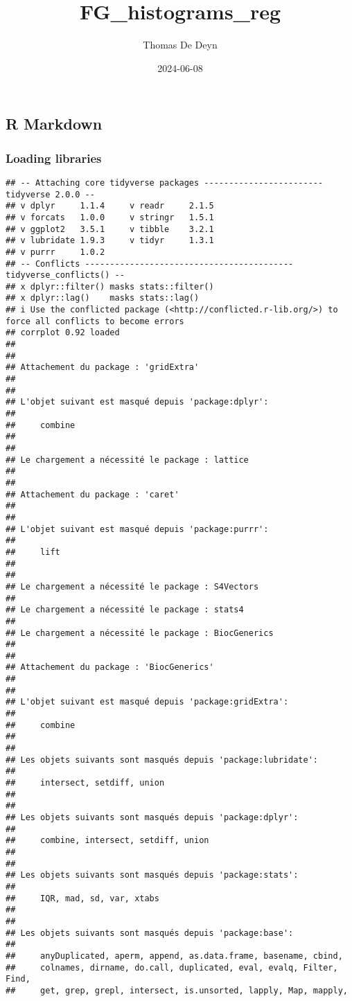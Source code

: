 \documentclass[
]{article}
\title{FG\_histograms\_reg}
\author{Thomas De Deyn}
\date{2024-06-08}
\begin{document}
\maketitle

\hypertarget{r-markdown}{%
\subsection{R Markdown}\label{r-markdown}}

\hypertarget{loading-libraries}{%
\subsubsection{Loading libraries}\label{loading-libraries}}

\begin{verbatim}
## -- Attaching core tidyverse packages ------------------------ tidyverse 2.0.0 --
## v dplyr     1.1.4     v readr     2.1.5
## v forcats   1.0.0     v stringr   1.5.1
## v ggplot2   3.5.1     v tibble    3.2.1
## v lubridate 1.9.3     v tidyr     1.3.1
## v purrr     1.0.2     
## -- Conflicts ------------------------------------------ tidyverse_conflicts() --
## x dplyr::filter() masks stats::filter()
## x dplyr::lag()    masks stats::lag()
## i Use the conflicted package (<http://conflicted.r-lib.org/>) to force all conflicts to become errors
## corrplot 0.92 loaded
## 
## 
## Attachement du package : 'gridExtra'
## 
## 
## L'objet suivant est masqué depuis 'package:dplyr':
## 
##     combine
## 
## 
## Le chargement a nécessité le package : lattice
## 
## 
## Attachement du package : 'caret'
## 
## 
## L'objet suivant est masqué depuis 'package:purrr':
## 
##     lift
## 
## 
## Le chargement a nécessité le package : S4Vectors
## 
## Le chargement a nécessité le package : stats4
## 
## Le chargement a nécessité le package : BiocGenerics
## 
## 
## Attachement du package : 'BiocGenerics'
## 
## 
## L'objet suivant est masqué depuis 'package:gridExtra':
## 
##     combine
## 
## 
## Les objets suivants sont masqués depuis 'package:lubridate':
## 
##     intersect, setdiff, union
## 
## 
## Les objets suivants sont masqués depuis 'package:dplyr':
## 
##     combine, intersect, setdiff, union
## 
## 
## Les objets suivants sont masqués depuis 'package:stats':
## 
##     IQR, mad, sd, var, xtabs
## 
## 
## Les objets suivants sont masqués depuis 'package:base':
## 
##     anyDuplicated, aperm, append, as.data.frame, basename, cbind,
##     colnames, dirname, do.call, duplicated, eval, evalq, Filter, Find,
##     get, grep, grepl, intersect, is.unsorted, lapply, Map, mapply,

\end{verbatim}
\end{document}
